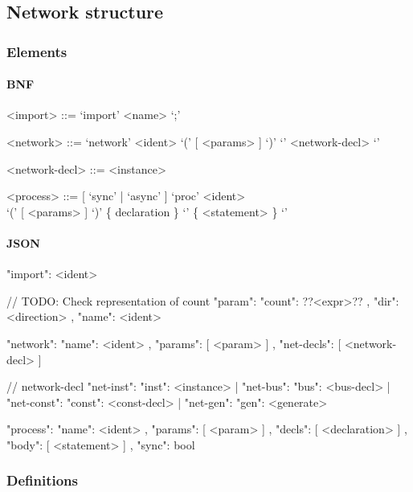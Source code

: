 \documentclass{article}
\begin{document}
\subsection{Network structure}

\subsubsection{Elements}
\paragraph{BNF}
\begin{grammar}
  <import> ::= `import' <name> `;'

  <network> ::= `network' <ident> `(' [ <params> ] `)' `{' <network-decl> `}'

  <network-decl> ::= <instance>

  <process> ::= [ `sync' | `async' ] `proc' <ident> \\ `(' [
  <params> ] `)' \{ declaration \} `{' \{ <statement> \} `}'
\end{grammar}

\paragraph{JSON}
\begin{jsoncode}
 {"import": <ident>}

 //  TODO: Check representation of count
 {"param": { "count": ??<expr>??
           , "dir": <direction>
           , "name": <ident>
           }
}

 {"network": { "name": <ident>
             , "params": [ <param> ]
             , "net-decls": [ <network-decl> ]
             }
 }

// network-decl
{ "net-inst": { "inst": <instance> }
| "net-bus": { "bus": <bus-decl> }
| "net-const": { "const": <const-decl> }
| "net-gen": { "gen": <generate> }
}

 {"process": { "name": <ident>
             , "params": [ <param> ]
             , "decls": [ <declaration> ]
             , "body": [ <statement> ]
             , "sync": bool
             }
}
\end{jsoncode}

\subsubsection{Definitions}
\end{document}
